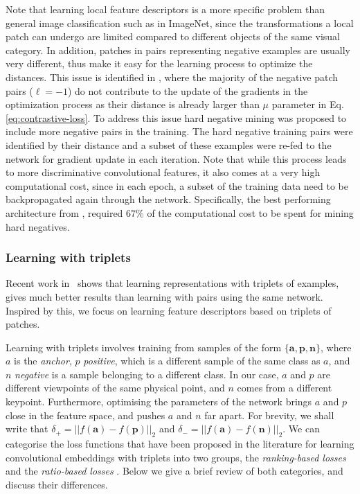 Note that learning local feature descriptors is a more specific
problem than general image classification such as in ImageNet, since
the transformations a local patch can undergo are limited compared to
different objects of the same visual category. In addition, patches in
pairs representing negative examples are usually very different, thus
make it easy for the learning process to optimize the distances. This
issue is identified in \cite{simo2015deepdesc}, where the majority of
the negative patch pairs ($\ell=-1$) do not contribute to the update
of the gradients in the optimization process as their distance is
already larger than $\mu$ parameter in
Eq. \eqref{eq:contrastive-loss}. To address this issue hard negative
mining was proposed \cite{simo2015deepdesc} to include more negative
pairs in the training. The hard negative training pairs were
identified by their distance and a subset of these examples were
re-fed to the network for gradient update in each iteration. Note that
while this process leads to more discriminative convolutional
features, it also comes at a very high computational cost, since in
each epoch, a subset of the training data need to be backpropagated
again through the network. Specifically, the best performing
architecture from \cite{simo2015deepdesc}, required $67\%$ of the
computational cost to be spent for mining hard negatives.


\subsubsection{Learning with triplets}
Recent work in~\cite{DBLP:journals/corr/HofferA14}
shows that learning representations with triplets of examples, gives much better results than
learning with pairs using the same network. Inspired by this, we  focus on learning feature descriptors based on triplets of  patches.

Learning with triplets involves training from samples of the form
$\{\boldsymbol a,\boldsymbol p,\boldsymbol n \}$, where $a$ is the
\textit{anchor}, $p$ \textit{positive}, which is a different sample of the
same class as $a$, and $n$ \textit{negative} is a sample
belonging to a different class. In our case, $a$ and $p$ are different
viewpoints of the same physical point, and $n$ comes from
a different keypoint. Furthermore, optimising the parameters of the
network  brings $a$ and $p$ close in the feature space, and pushes $a$ and $n$ far apart.  For
brevity, we shall write that
$\delta_{+} = ||f(\boldsymbol a)-f(\boldsymbol p)||_2$ and
$\delta_{-} = ||f(\boldsymbol a)-f(\boldsymbol n)||_2$. We can
categorise the loss functions that have been proposed in the
literature for learning convolutional embeddings with triplets into
two groups, the {\em ranking-based losses} and the {\em ratio-based
  losses}
\cite{wohlhart15,DBLP:journals/corr/HofferA14,DBLP:journals/corr/WangSLRWPCW14}. Below
we give a brief review of both categories, and  discuss their
differences.


